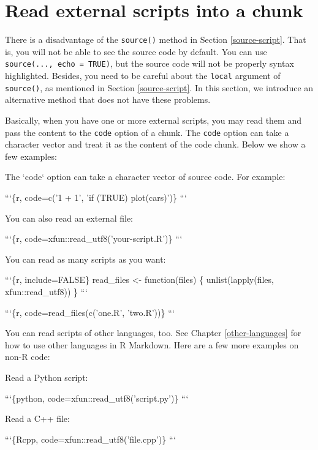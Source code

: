 \documentclass[
  11pt,
]{krantz}
\newenvironment{Shaded}{\begin{snugshade}}{\end{snugshade}}
\newcommand{\BaseNTok}[1]{\textcolor[rgb]{0.06,0.06,0.06}{#1}}
\newcommand{\NormalTok}[1]{#1}
\begin{document}
\hypertarget{option-code}{%
\section{Read external scripts into a chunk}\label{option-code}}

There is a disadvantage of the \texttt{source()} method in Section \ref{source-script}. That is, you will not be able to see the source code by default. You can use \texttt{source(...,\ echo\ =\ TRUE)}, but the source code will not be properly syntax highlighted. Besides, you need to be careful about the \texttt{local} argument of \texttt{source()}, as mentioned in Section \ref{source-script}. In this section, we introduce an alternative method that does not have these problems.

Basically, when you have one or more external scripts, you may read them and pass the content to the \texttt{code} option of a chunk. The \texttt{code} option can take a character vector and treat it as the content of the code chunk. Below we show a few examples:

\begin{Shaded}
\begin{Highlighting}[]
\NormalTok{The }\BaseNTok{`code`}\NormalTok{ option can take a character vector of source code.}
\NormalTok{For example:}

\BaseNTok{```\{r, code=c('1 + 1', 'if (TRUE) plot(cars)')\}}
\BaseNTok{```}

\NormalTok{You can also read an external file:}

\BaseNTok{```\{r, code=xfun::read_utf8('your-script.R')\}}
\BaseNTok{```}

\NormalTok{You can read as many scripts as you want:}

\BaseNTok{```\{r, include=FALSE\}}
\BaseNTok{read_files <- function(files) \{}
\BaseNTok{  unlist(lapply(files, xfun::read_utf8))}
\BaseNTok{\}}
\BaseNTok{```}

\BaseNTok{```\{r, code=read_files(c('one.R', 'two.R'))\}}
\BaseNTok{```}
\end{Highlighting}
\end{Shaded}

You can read scripts of other languages, too. See Chapter \ref{other-languages} for how to use other languages in R Markdown. Here are a few more examples on non-R code:

\begin{Shaded}
\begin{Highlighting}[]
\NormalTok{Read a Python script:}

\BaseNTok{```\{python, code=xfun::read_utf8('script.py')\}}
\BaseNTok{```}

\NormalTok{Read a C++ file:}

\BaseNTok{```\{Rcpp, code=xfun::read_utf8('file.cpp')\}}
\BaseNTok{```}
\end{Highlighting}
\end{Shaded}
\end{document}

